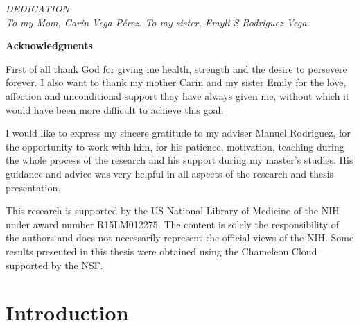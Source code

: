\documentclass[12pt]{report}
\begin{document}
	\vspace*{\fill}
	\begin{center}
		\textit{DEDICATION}\\
		\vspace{2cm}
		\textit{To my Mom, Carin Vega P\'erez. To my sister, Emyli S Rodriguez Vega.}
	\end{center}
	\vfill
	\clearpage
	
	\vspace*{\fill}
	
	\begin{center}
		\Large \textbf{Acknowledgments}
	\end{center}
	First of all thank God for giving me health, strength and the desire to persevere forever. I also want to thank my mother Carin and my sister Emily for the love, affection and unconditional support they have always given me, without which it would have been more difficult to achieve this goal.
	
	I would like to express my sincere gratitude to my adviser Manuel Rodriguez, for the opportunity to work with him, for his patience, motivation, teaching during the whole process of the research and his support during my master's studies. His guidance and advice was very helpful in all aspects of the research and thesis presentation.
	
	This research is supported by the \ac{US} National Library of Medicine of the \ac{NIH} under award number R15LM012275. The content is solely the responsibility of the authors and does not necessarily represent the official views of the \ac{NIH}. Some results presented in this thesis were obtained using the Chameleon Cloud supported by the \ac{NSF}.
	\vfill
	\doublespacing
	
	\tableofcontents{}
	
	\newpage
	\printacronyms[include-classes=abbrev,name=List of Abbreviations]
	\newpage
	\listoffigures{}
	\newpage
	\listoftables{}
	
	\newpage
	
	\fancyhf{}
	\fancyhead[R]{\thepage} 
	\renewcommand{\figurename}{Fig}
	\onehalfspacing
	\chapter{Introduction}\label{Chapter 1}
	\doublespacing
	
\end{document}
